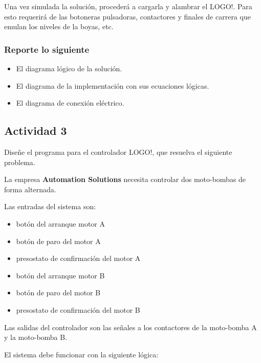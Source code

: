 Una vez simulada la solución, procederá a cargarla y alambrar el LOGO!. Para esto requerirá de las botoneras pulsadoras, contactores y finales de carrera que emulan los niveles de la boyas, etc. 


\subsubsection{Reporte lo siguiente}

\begin{itemize}
	\item El diagrama lógico de la solución.
	\item El diagrama de la implementación con sus  ecuaciones lógicas.
	\item El diagrama de conexión eléctrico.
\end{itemize}

\subsection{Actividad 3}
Diseñe el programa para el controlador LOGO!, que resuelva el siguiente problema.

La empresa \textbf{Automation Solutions} necesita controlar dos moto-bombas de forma alternada.

Las entradas del sistema son: 
\begin{itemize}
	\item botón del arranque motor A
	\item botón de paro del motor A
	\item presostato de confirmación del motor A
	\item botón del arranque motor B
	\item botón de paro del motor B
	\item presostato de confirmación del motor B
\end{itemize}

Las salidas del controlador son las señales a los contactores de la moto-bomba A y la moto-bomba B.

El sistema debe funcionar con la siguiente lógica:

